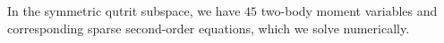 \documentclass[aps,pra,twocolumn,superscriptaddress]{revtex4-1} %
\begin{document}
\begin{appendix}
In the symmetric qutrit subspace, we have $ 45 $ two-body moment variables and corresponding sparse second-order equations, which we solve numerically. 


\end{appendix}
\end{document}
